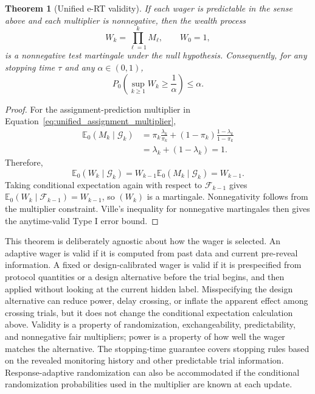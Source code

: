 \documentclass[10pt]{article}
\newtheorem{theorem}{Theorem}
\begin{document}
\begin{theorem}[Unified e-RT validity]
If each wager is predictable in the sense above and each multiplier is nonnegative, then the wealth process
\begin{equation}
W_k = \prod_{\ell=1}^{k} M_\ell, \qquad W_0=1,
\end{equation}
is a nonnegative test martingale under the null hypothesis. Consequently, for any stopping time $\tau$ and any $\alpha \in (0,1)$,
\begin{equation}
P_0\left(\sup_{k \geq 1} W_k \geq \frac{1}{\alpha}\right) \leq \alpha.
\end{equation}
\end{theorem}

\begin{proof}
For the assignment-prediction multiplier in Equation~\ref{eq:unified_assignment_multiplier},
\begin{align}
\mathbb{E}_0(M_k \mid \mathcal{G}_k)
&= \pi_k \frac{\lambda_k}{\pi_k}
 + (1-\pi_k)\frac{1-\lambda_k}{1-\pi_k} \\
&= \lambda_k + (1-\lambda_k) = 1.
\end{align}
Therefore,
\begin{equation}
\mathbb{E}_0(W_k \mid \mathcal{G}_k)
= W_{k-1}\mathbb{E}_0(M_k \mid \mathcal{G}_k)
= W_{k-1}.
\end{equation}
Taking conditional expectation again with respect to $\mathcal{F}_{k-1}$ gives $\mathbb{E}_0(W_k \mid \mathcal{F}_{k-1})=W_{k-1}$, so $(W_k)$ is a martingale. Nonnegativity follows from the multiplier constraint. Ville's inequality for nonnegative martingales \citep{ville1939} then gives the anytime-valid Type I error bound.
\end{proof}

This theorem is deliberately agnostic about how the wager is selected. An adaptive wager is valid if it is computed from past data and current pre-reveal information. A fixed or design-calibrated wager is valid if it is prespecified from protocol quantities or a design alternative before the trial begins, and then applied without looking at the current hidden label. Misspecifying the design alternative can reduce power, delay crossing, or inflate the apparent effect among crossing trials, but it does not change the conditional expectation calculation above. Validity is a property of randomization, exchangeability, predictability, and nonnegative fair multipliers; power is a property of how well the wager matches the alternative. The stopping-time guarantee covers stopping rules based on the revealed monitoring history and other predictable trial information. Response-adaptive randomization can also be accommodated if the conditional randomization probabilities used in the multiplier are known at each update.
\end{document}
